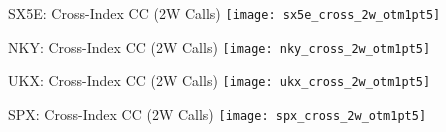 \documentclass{beamer}
\begin{document}
\begin{frame}{SX5E: Cross-Index CC (2W Calls)}
\texttt{[image: sx5e\_cross\_2w\_otm1pt5]}
\end{frame}

\begin{frame}{NKY: Cross-Index CC (2W Calls)}
\texttt{[image: nky\_cross\_2w\_otm1pt5]}
\end{frame}

\begin{frame}{UKX: Cross-Index CC (2W Calls)}
\texttt{[image: ukx\_cross\_2w\_otm1pt5]}
\end{frame}

\begin{frame}{SPX: Cross-Index CC (2W Calls)}
\texttt{[image: spx\_cross\_2w\_otm1pt5]}
\end{frame}
\end{document}
